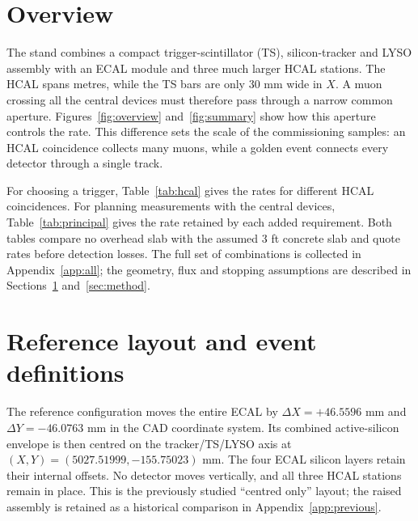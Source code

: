 \begin{abstract}
We estimate cosmic-muon coincidence rates in the ESA test stand with the
ECAL centred on the tracker axis and the remaining detectors at their original
heights. A golden cosmic event crosses all 26 active layers. Its estimated rate
is \goldNo{} per hour without an overhead slab and \goldRoof{} per hour beneath
3 ft of concrete. Requiring only the ten HCAL layers gives \hcalNo{} and
\hcalRoof{} per hour, respectively. We compare HCAL trigger definitions,
relax the tracker and other detector requirements, and tabulate every combination
of the three HCAL stations, the TS, LYSO and ECAL requirements, and tracker
multiplicity. The calculation uses the registered detector geometry, a sea-level
muon spectrum and continuous-range estimates along each trajectory. These are
muon-crossing rates before detector response; measured trigger
rates will also depend on thresholds, efficiency, noise and live time.
\end{abstract}

\section*{Overview}
The stand combines a compact trigger-scintillator (TS), silicon-tracker and
LYSO assembly with an ECAL module and three much larger HCAL stations.
The HCAL spans metres, while the TS bars are only 30 mm wide in $X$.
A muon crossing all the central devices must therefore pass through a narrow
common aperture.
Figures~\ref{fig:overview} and~\ref{fig:summary} show how this aperture controls the rate. This difference sets the scale of the commissioning samples: an HCAL
coincidence collects many muons, while a golden event connects every detector
through a single track.

For choosing a trigger, Table~\ref{tab:hcal} gives the rates for different HCAL
coincidences. For planning measurements with the central devices,
Table~\ref{tab:principal} gives the rate retained by each added requirement.
Both tables compare no overhead slab with the assumed 3 ft concrete slab and quote
rates before detection losses. The full set of combinations is collected in
Appendix~\ref{app:all}; the geometry, flux and stopping assumptions are described
in Sections~\ref{sec:layout} and~\ref{sec:method}.



\section{Reference layout and event definitions}
\label{sec:layout}
The reference configuration moves the entire ECAL by
$\Delta X=+46.5596$ mm and $\Delta Y=-46.0763$ mm in the CAD coordinate system.
Its combined active-silicon envelope is then centred on the tracker/TS/LYSO
axis at $(X,Y)=(5027.51999,-155.75023)$ mm. The four ECAL silicon layers
retain their internal offsets. No detector moves vertically, and all three
HCAL stations remain in place. This is the previously studied ``centred only''
layout; the raised assembly is retained as a historical comparison in
Appendix~\ref{app:previous}.

